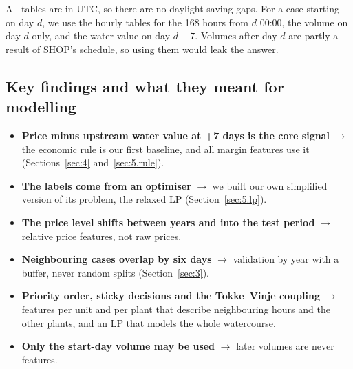 All tables are in UTC, so there are no daylight-saving gaps. For a case starting on day $d$, we use the hourly tables for the 168 hours from $d$ 00:00, the volume on day $d$ only, and the water value on day $d+7$. Volumes after day $d$ are partly a result of SHOP's schedule, so using them would leak the answer.

\begin{table}[H]
  \centering\small
  \caption{Cleaning summary}
  \label{tab:2.4}
\end{table}

\subsection{Key findings and what they meant for modelling}\label{sec:2.7}

\begin{itemize}
  \item \textbf{Price minus upstream water value at +7 days is the core signal} $\rightarrow$ the economic rule is our first baseline, and all margin features use it (Sections~\ref{sec:4} and~\ref{sec:5.rule}).
  \item \textbf{The labels come from an optimiser} $\rightarrow$ we built our own simplified version of its problem, the relaxed LP (Section~\ref{sec:5.lp}).
  \item \textbf{The price level shifts between years and into the test period} $\rightarrow$ relative price features, not raw prices.
  \item \textbf{Neighbouring cases overlap by six days} $\rightarrow$ validation by year with a buffer, never random splits (Section~\ref{sec:3}).
  \item \textbf{Priority order, sticky decisions and the Tokke--Vinje coupling} $\rightarrow$ features per unit and per plant that describe neighbouring hours and the other plants, and an LP that models the whole watercourse.
  \item \textbf{Only the start-day volume may be used} $\rightarrow$ later volumes are never features.
\end{itemize}

